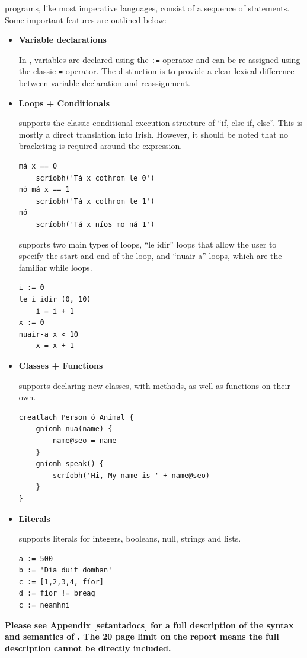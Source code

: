 \Setanta{} programs, like most imperative languages, consist of a sequence of statements. Some important \Setanta{} features are outlined below:
\begin{itemize}
    \item \textbf{Variable declarations}

        In \Setanta{}, variables are declared using the \verb|:=| operator and can be re-assigned using the classic \verb|=| operator. The distinction is to provide a clear lexical difference between variable declaration and reassignment.
    \item \textbf{Loops + Conditionals}

        \Setanta{} supports the classic conditional execution structure of ``if, else if, else''. This is mostly a direct translation into Irish. However, it should be noted that no bracketing is required around the expression.

            \begin{lstlisting}[language=setanta, frame=single, caption=Setanta conditionals]
má x == 0
    scríobh('Tá x cothrom le 0')
nó má x == 1
    scríobh('Tá x cothrom le 1')
nó
    scríobh('Tá x níos mo ná 1')
            \end{lstlisting}

            \Setanta{} supports two main types of loops, ``le idir'' loops that allow the user to specify the start and end of the loop, and ``nuair-a'' loops, which are the familiar while loops.

            \begin{lstlisting}[language=setanta, frame=single, caption=Setanta loops]
i := 0
le i idir (0, 10)
    i = i + 1
x := 0
nuair-a x < 10
    x = x + 1
            \end{lstlisting}
        \item \textbf{Classes + Functions}

            \Setanta{} supports declaring new classes, with methods, as well as functions on their own.
            \begin{lstlisting}[language=setanta, frame=single, caption=Setanta classes]
creatlach Person ó Animal {
    gníomh nua(name) {
        name@seo = name
    }
    gníomh speak() {
        scríobh('Hi, My name is ' + name@seo)
    }
}
            \end{lstlisting}
        \item \textbf{Literals}

            \Setanta{} supports literals for integers, booleans, null, strings and lists.
            \begin{lstlisting}[language=setanta, frame=single, caption=Setanta literals]
a := 500
b := 'Dia duit domhan'
c := [1,2,3,4, fíor]
d := fíor != breag
c := neamhní
            \end{lstlisting}

\end{itemize}
            \noindent\textbf{Please see \hyperref[setantadocs]{Appendix \ref*{setantadocs}} for a full description of the syntax and semantics of \Setanta{}. The 20 page limit on the report means the full description cannot be directly included.}

